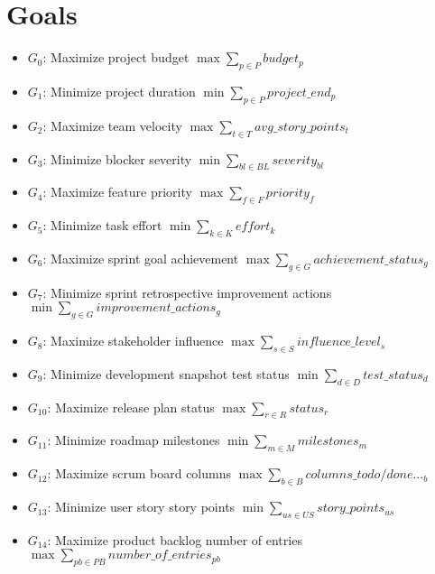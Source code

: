 \documentclass{article}
\begin{document}
\section{Goals}
\begin{itemize}
    \item $G_0$: Maximize project budget $\max \sum_{p \in P} budget_p$
    \item $G_1$: Minimize project duration $\min \sum_{p \in P} project\_end_p$
    \item $G_2$: Maximize team velocity $\max \sum_{t \in T} avg\_story\_points_t$
    \item $G_3$: Minimize blocker severity $\min \sum_{bl \in BL} severity_{bl}$
    \item $G_4$: Maximize feature priority $\max \sum_{f \in F} priority_f$
    \item $G_5$: Minimize task effort $\min \sum_{k \in K} effort_k$
    \item $G_6$: Maximize sprint goal achievement $\max \sum_{g \in G} achievement\_status_g$
    \item $G_7$: Minimize sprint retrospective improvement actions $\min \sum_{g \in G} improvement\_actions_g$
    \item $G_8$: Maximize stakeholder influence $\max \sum_{s \in S} influence\_level_s$
    \item $G_9$: Minimize development snapshot test status $\min \sum_{d \in D} test\_status_d$
    \item $G_{10}$: Maximize release plan status $\max \sum_{r \in R} status_r$
    \item $G_{11}$: Minimize roadmap milestones $\min \sum_{m \in M} milestones_m$
    \item $G_{12}$: Maximize scrum board columns $\max \sum_{b \in B} columns\_todo/done..._b$
    \item $G_{13}$: Minimize user story story points $\min \sum_{us \in US} story\_points_{us}$
    \item $G_{14}$: Maximize product backlog number of entries $\max \sum_{pb \in PB} number\_of\_entries_{pb}$
\end{itemize}
\end{document}
